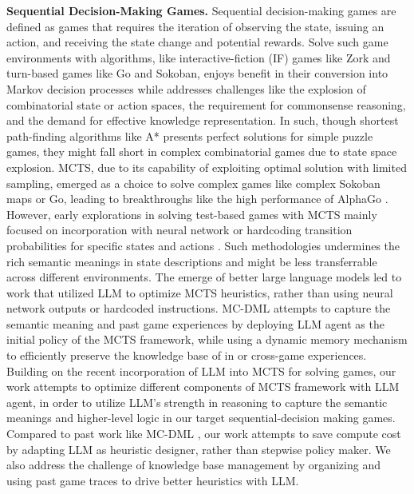 \documentclass{article}
\begin{document}
\textbf{Sequential Decision-Making Games.}
Sequential decision-making games are defined as games that requires the iteration of observing the state, issuing an action, and receiving the state change and potential rewards\cite{Part1Jericho}\cite{Part2MCSurvey}. Solve such game environments with algorithms, like interactive-fiction (IF) games like Zork\cite{Part1Jericho} and turn-based games like Go and Sokoban\cite{Part1SokobanMCTS}, enjoys benefit in their conversion into Markov decision processes\cite{Part1Jericho} while addresses challenges like the explosion of combinatorial state or action spaces, the requirement for commonsense reasoning, and the demand for effective knowledge representation\cite{Part1Jericho}. In such, though shortest path-finding algorithms like A* presents perfect solutions for simple puzzle games, they might fall short in complex combinatorial games due to state space explosion. MCTS, due to its capability of exploiting optimal solution with limited sampling, emerged as a choice to solve complex games like complex Sokoban maps\cite{Part1SokobanMCTS}\cite{Part1SokobanDRL} or Go, leading to breakthroughs like the high performance of AlphaGo \cite{Part2GoNNMCTS}. However, early explorations in solving test-based games with MCTS mainly focused on incorporation with neural network\cite{Part1Jericho} or hardcoding transition probabilities for specific states and actions \cite{Part1NAIL}. Such methodologies undermines the rich semantic meanings in state descriptions and might be less transferrable across different environments. The emerge of better large language models led to work that utilized LLM to optimize MCTS heuristics, rather than using neural network outputs or hardcoded instructions. MC-DML \cite{Part2MCLLM} attempts to capture the semantic meaning and past game experiences by deploying LLM agent as the initial policy of the MCTS framework, while using a dynamic memory mechanism to efficiently preserve the knowledge base of in or cross-game experiences. Building on the recent incorporation of LLM into MCTS for solving games, our work attempts to optimize different components of MCTS framework with LLM agent, in order to utilize LLM's strength in reasoning to capture the semantic meanings and higher-level logic in our target sequential-decision making games. Compared to past work like MC-DML \cite{Part2MCLLM}, our work attempts to save compute cost by adapting LLM as heuristic designer, rather than stepwise policy maker. We also address the challenge of knowledge base management by organizing and using past game traces to drive better heuristics with LLM.
\end{document}
